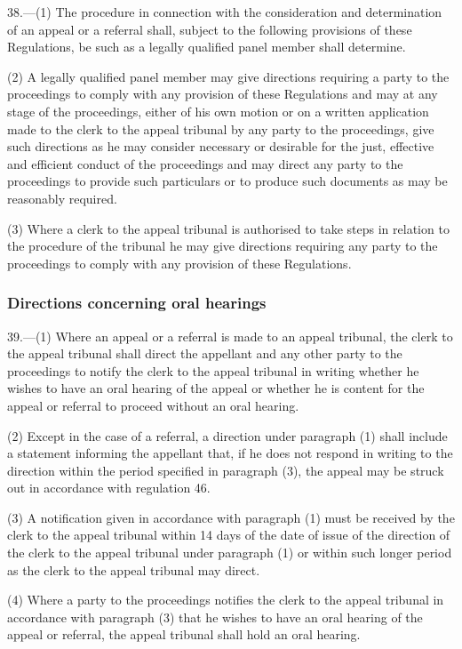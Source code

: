 \documentclass[12pt,a4paper]{article}
\begin{document}
38.—(1) The procedure in connection with the consideration and determination of an appeal or a referral shall, subject to the following provisions of these Regulations, be such as a legally qualified panel member shall determine.

(2) A legally qualified panel member may give directions requiring a party to the proceedings to comply with any provision of these Regulations and may at any stage of the proceedings, either of his own motion or on a written application made to the clerk to the appeal tribunal by any party to the proceedings, give such directions as he may consider necessary or desirable for the just, effective and efficient conduct of the proceedings and may direct any party to the proceedings to provide such particulars or to produce such documents as may be reasonably required.

(3) Where a clerk to the appeal tribunal is authorised to take steps in relation to the procedure of the tribunal he may give directions requiring any party to the proceedings to comply with any provision of these Regulations.

\subsubsection[39. Directions concerning oral hearings]{Directions concerning oral hearings}

39.—(1) Where an appeal or a referral is made to an appeal tribunal, the clerk to the appeal tribunal shall direct the appellant and any other party to the proceedings to notify the clerk to the appeal tribunal in writing whether he wishes to have an oral hearing of the appeal or whether he is content for the appeal or referral to proceed without an oral hearing.

(2) Except in the case of a referral, a direction under paragraph (1) shall include a statement informing the appellant that, if he does not respond in writing to the direction within the period specified in paragraph (3), the appeal may be struck out in accordance with regulation 46.

(3) A notification given in accordance with paragraph (1) must be received by the clerk to the appeal tribunal within 14 days of the date of issue of the direction of the clerk to the appeal tribunal under paragraph (1) or within such longer period as the clerk to the appeal tribunal may direct.

(4) Where a party to the proceedings notifies the clerk to the appeal tribunal in accordance with paragraph (3) that he wishes to have an oral hearing of the appeal or referral, the appeal tribunal shall hold an oral hearing.
\end{document}
